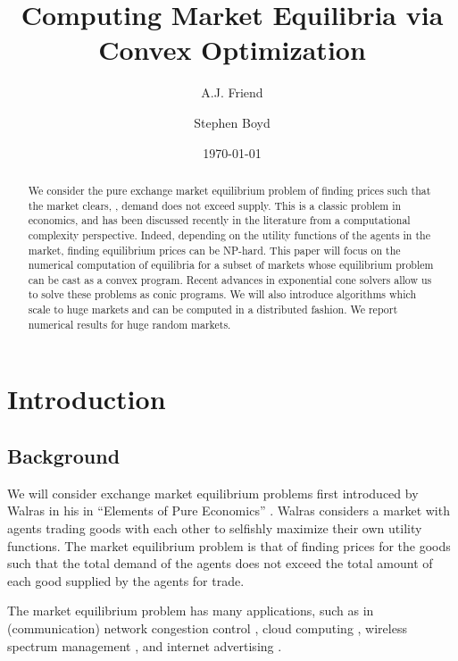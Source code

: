 \documentclass[12pt]{article}
\title{Computing Market Equilibria via Convex Optimization}
\author{A.J. Friend \and Stephen Boyd}
\date{\today}
\begin{document}
\maketitle

\begin{abstract}

We consider the pure exchange market equilibrium problem of finding prices such
that the market clears, \ie, demand does not exceed supply. This is a classic
problem in economics, and has been discussed recently in the literature from a
computational complexity perspective. Indeed, depending on the utility
functions of the agents in the market, finding equilibrium prices can be
NP-hard. This paper will focus on the numerical computation of equilibria for a
subset of markets whose equilibrium problem can be cast as a convex program.
Recent advances in exponential cone solvers allow us to solve these problems as
conic programs. We will also introduce algorithms which scale to huge markets
and can be computed in a distributed fashion. We report numerical results for
huge random markets.

\end{abstract}

\newpage
\tableofcontents
\newpage


\section{Introduction}
\subsection{Background}

We will consider exchange market equilibrium problems first introduced by
Walras in his in ``Elements of Pure Economics'' \cite{walras1896elements}.
Walras considers a market with agents trading goods with each other to selfishly
maximize their own utility functions. The market equilibrium problem is that of
finding prices for the goods such that the total demand of the agents does not
exceed the total amount of each good supplied by the agents for trade.

The market equilibrium problem has many applications, such as in (communication) network
congestion control \cite{kelly1997charging,srikant2004mathematics,
kelly1998rate,
low1999optimization,
yaiche2000game}, cloud computing \cite{gomes2012pure}, wireless spectrum management
\cite{ye2014competitive,vazirani2012notion},
and internet advertising \cite{vazirani2010spending}.
\end{document}

